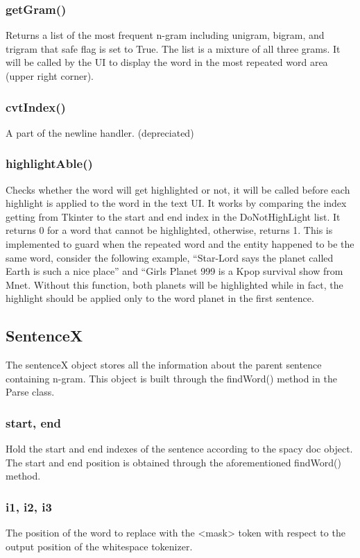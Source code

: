 \documentclass[12pt,oneside,openright,a4paper]{cpe-english-project}
\begin{document}
\subsubsection{getGram()}
Returns a list of the most frequent n-gram including unigram, bigram, and trigram that safe flag is set to True. The list is a mixture of all three grams. It will be called by the UI to display the word in the most repeated word area (upper right corner). 
\subsubsection{cvtIndex()}
A part of the newline handler. (depreciated)

\subsubsection{highlightAble() }
Checks whether the word will get highlighted or not, it will be called before each highlight is applied to the word in the text UI. It works by comparing the index getting from Tkinter to the start and end index in the DoNotHighLight list. It returns 0 for a word that cannot be highlighted, otherwise, returns 1. This is implemented to guard when the repeated word and the entity happened to be the same word, consider the following example, “Star-Lord says the planet called Earth is such a nice place” and “Girls Planet 999 is a Kpop survival show from Mnet. Without this function, both planets will be highlighted while in fact, the highlight should be applied only to the word planet in the first sentence.

\subsection{SentenceX}
The sentenceX object stores all the information about the parent sentence containing n-gram. This object is built through the findWord() method in the Parse class. 

\subsubsection{ start, end }
Hold the start and end indexes of the sentence according to the spacy doc object. The start and end position is obtained through the aforementioned findWord() method. 


\subsubsection{ i1, i2, i3 }
The position of the word to replace with the <mask> token with respect to the output position of the whitespace tokenizer. 
\end{document}
